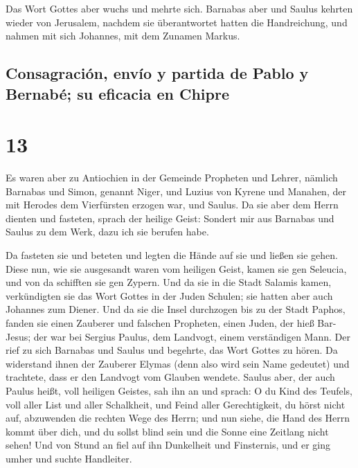  Das Wort Gottes aber wuchs und mehrte sich.
 Barnabas aber und Saulus kehrten wieder von Jerusalem,
nachdem sie überantwortet hatten die Handreichung, und nahmen mit sich
Johannes, mit dem Zunamen Markus.

\hypertarget{consagraciuxf3n-envuxedo-y-partida-de-pablo-y-bernabuxe9-su-eficacia-en-chipre}{%
\subsection{Consagración, envío y partida de Pablo y Bernabé; su
eficacia en
Chipre}\label{consagraciuxf3n-envuxedo-y-partida-de-pablo-y-bernabuxe9-su-eficacia-en-chipre}}

\hypertarget{section-12}{%
\section{13}\label{section-12}}

 Es waren aber zu Antiochien in der Gemeinde Propheten und
Lehrer, nämlich Barnabas und Simon, genannt Niger, und Luzius von Kyrene
und Manahen, der mit Herodes dem Vierfürsten erzogen war, und Saulus.
 Da sie aber dem Herrn dienten und fasteten, sprach der
heilige Geist: Sondert mir aus Barnabas und Saulus zu dem Werk, dazu ich
sie berufen habe.

 Da fasteten sie und beteten und legten die Hände auf sie
und ließen sie gehen.  Diese nun, wie sie ausgesandt waren
vom heiligen Geist, kamen sie gen Seleucia, und von da schifften sie gen
Zypern.  Und da sie in die Stadt Salamis kamen,
verkündigten sie das Wort Gottes in der Juden Schulen; sie hatten aber
auch Johannes zum Diener.  Und da sie die Insel durchzogen
bis zu der Stadt Paphos, fanden sie einen Zauberer und falschen
Propheten, einen Juden, der hieß Bar-Jesus;  der war bei
Sergius Paulus, dem Landvogt, einem verständigen Mann. Der rief zu sich
Barnabas und Saulus und begehrte, das Wort Gottes zu hören.
 Da widerstand ihnen der Zauberer Elymas (denn also wird
sein Name gedeutet) und trachtete, dass er den Landvogt vom Glauben
wendete.  Saulus aber, der auch Paulus heißt, voll
heiligen Geistes, sah ihn an  und sprach: O du Kind des
Teufels, voll aller List und aller Schalkheit, und Feind aller
Gerechtigkeit, du hörst nicht auf, abzuwenden die rechten Wege des
Herrn;  und nun siehe, die Hand des Herrn kommt über
dich, und du sollst blind sein und die Sonne eine Zeitlang nicht sehen!
Und von Stund an fiel auf ihn Dunkelheit und Finsternis, und er ging
umher und suchte Handleiter.

